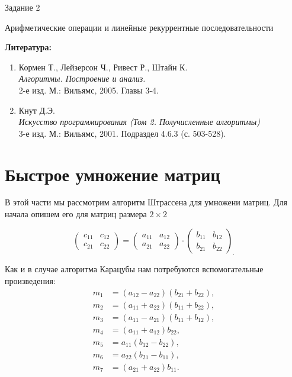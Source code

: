 \documentclass[12pt, leqno]{article}
\theoremstyle{definiton}
\theoremstyle{definition}
\theoremstyle{definition}
\begin{document}
\centerline{\LARGE Задание 2}

\medskip

\begin{center}
	{\Large Арифметические операции и линейные рекуррентные последовательности }
\end{center}

\bigskip

{\bf Литература: }
\begin{enumerate}

\item Кормен Т., Лейзерсон Ч., Ривест Р., Штайн К. \\ {\it Алгоритмы. Построение и анализ. }\\  2-е изд. М.: Вильямс, 2005. Главы 3-4.
\item Кнут Д.Э. \\ {\it Искусство программирования (Том 2. Получисленные алгоритмы) }\\  3-е изд. М.: Вильямс, 2001. Подраздел 4.6.3 (с. 503-528).

\end{enumerate}

\section{Быстрое умножение матриц}

В этой части мы рассмотрим алгоритм Штрассена для умножени матриц. Для начала опишем его для матриц размера $2\times 2$

$$ 
	\begin{pmatrix}
		c_{11} & c_{12}\\
		c_{21} & c_{22}
	\end{pmatrix}
	= 
	\begin{pmatrix}
		a_{11} & a_{12}\\
		a_{21} & a_{22}
	\end{pmatrix}
	\cdot
	\begin{pmatrix}
		b_{11} & b_{12}\\
		b_{21} & b_{22}
	\end{pmatrix}_.	
$$

Как и в случае алгоритма Карацубы нам потребуются вспомогательные произведения:
\begin{align*}
	m_1 &= (a_{12}-a_{22})(b_{21}+b_{22}),\\
	m_2 &= (a_{11}+a_{22})(b_{11}+b_{22}),\\
	m_3 &= (a_{11}-a_{21})(b_{11}+b_{12}),\\
	m_4 &= (a_{11}+a_{12})b_{22},\\
	m_5 &= a_{11}(b_{12}-b_{22}),\\
	m_6 &= a_{22}(b_{21}-b_{11}),\\
	m_7 &= (a_{21}+a_{22})b_{11}.
\end{align*}
\end{document}
